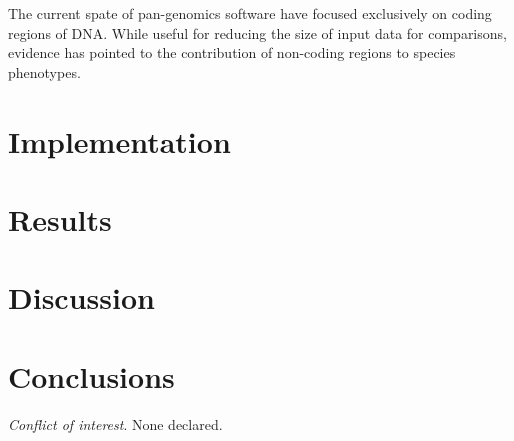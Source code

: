 \documentclass{article}
\begin{document}


The current spate of pan-genomics software have focused exclusively on coding regions of DNA.
While useful for reducing the size of input data for comparisons, evidence \cite{} has pointed to the contribution of non-coding regions to species phenotypes.


\section{Implementation}

\section{Results}

\section{Discussion}


\section{Conclusions}


\textit{Conflict of interest}. None declared.

\newpage



\end{document}
